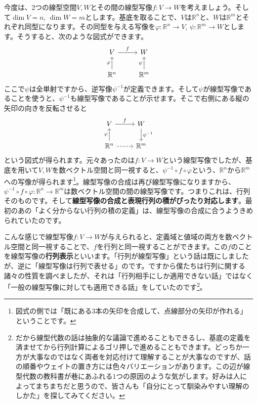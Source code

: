 今度は、$2$つの線型空間$V, W$とその間の線型写像$f\colon V\rightarrow W$を考えましょう。そして$\dim V = n$, $\dim W = m$とします。基底を取ることで、$V$は$\mathbb{R}^n$と、$W$は$\mathbb{R}^m$とそれぞれ同型になります。その同型を与える写像を$\varphi\colon\mathbb{R}^n \rightarrow V$, $\psi\colon\mathbb{R}^m \rightarrow W$とします。そうすると、次のような図式ができます。
\[
\begin{tikzcd}
V \arrow{r}{f} & W \\
\mathbb{R}^n \arrow{u}{\varphi} & \mathbb{R}^m \arrow{u}{\psi}
\end{tikzcd}
\]
ここで$\psi$は全単射ですから、逆写像$\psi^{-1}$が定義できます。そして$\psi$が線型写像であることを使うと、$\psi^{-1}$も線型写像であることが示せます。そこで右側にある縦の矢印の向きを反転させると
\[
\begin{tikzcd}
V \arrow{r}{f} & W \arrow{d}{\psi^{-1}} \\
\mathbb{R}^n \arrow{u}{\varphi} \arrow[dashed]{r} & \mathbb{R}^m
\end{tikzcd}
\]
という図式が得られます。元々あったのは$f\colon V\rightarrow W$という線型写像でしたが、基底を用いて$V, W$を数ベクトル空間と同一視すると、$\psi^{-1} \circ f \circ \varphi$という、$\mathbb{R}^n$から$\mathbb{R}^m$への写像が得られます\footnote{図式の側では「既にある$3$本の矢印を合成して、点線部分の矢印が作れる」ということです。}。線型写像の合成は再び線型写像になりますから、$\psi^{-1} \circ f \circ \varphi\colon \mathbb{R}^n \rightarrow\mathbb{R}^m$は数ベクトル空間の間の線型写像です。つまりこれは、行列そのものです。そして\textbf{線型写像の合成と表現行列の積がぴったり対応します}。最初のあの「よく分からない行列の積の定義」は、線型写像の合成に合うようきめられていたのです。

こんな感じで線型写像$f\colon V \rightarrow W$が与えられると、定義域と値域の両方を数ベクトル空間と同一視することで、$f$を行列と同一視することができます。この$f$のことを線型写像の\textbf{行列表示}といいます。「行列が線型写像」という話は既にしましたが、逆に「線型写像は行列で表せる」のです。ですから僕たちは行列に関する諸々の性質を調べましたが、それは「行列相手にしか適用できない話」ではなく「一般の線型写像に対しても適用できる話」をしていたのです\footnote{だから線型代数の話は抽象的な議論で進めることもできるし、基底の定義を済ませてから行列計算によるゴリ押しで進めることもできます。どっちか一方が大事なのではなく両者を対応付けて理解することが大事なのですが、話の順番やウェイトの置き方には色々バリエーションがあります。この辺が線型代数の教科書が巷にあふれる$1$つの原因のような気がします。好みは人によってまちまちだと思うので、皆さんも「自分にとって馴染みやすい理解のしかた」を探してみてください。}。

